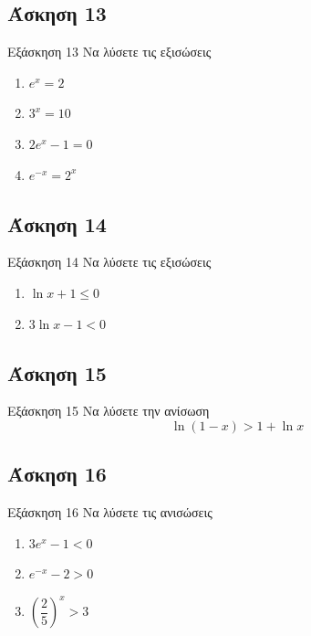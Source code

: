 \documentclass[greek]{beamer}
\begin{document}
\subsection{Άσκηση 13}
\begin{frame}[label=Άσκηση13,t]{Εξάσκηση 13}
 Να λύσετε τις εξισώσεις
 \begin{enumerate}
  \item<1-> $e^x=2$
  \item<2-> $3^x=10$
  \item<3-> $2e^x-1=0$
  \item<4-> $e^{-x}=2^x$
 \end{enumerate}

\end{frame}

\subsection{Άσκηση 14}
\begin{frame}[label=Άσκηση14,t]{Εξάσκηση 14}
 Να λύσετε τις εξισώσεις
 \begin{enumerate}
  \item<1-> $\ln x+1\le 0$
  \item<2-> $3\ln x-1<0$
 \end{enumerate}

\end{frame}

\subsection{Άσκηση 15}
\begin{frame}[label=Άσκηση15,t]{Εξάσκηση 15}
 Να λύσετε την ανίσωση $$\ln (1-x)>1+\ln x$$

\end{frame}

\subsection{Άσκηση 16}
\begin{frame}[label=Άσκηση16,t]{Εξάσκηση 16}
 Να λύσετε τις ανισώσεις
 \begin{enumerate}
  \item<1-> $3e^x-1<0$
  \item<2-> $e^{-x}-2>0$
  \item<3-> $\left( \dfrac{2}{5} \right)^x>3 $
 \end{enumerate}

\end{frame}
\end{document}
